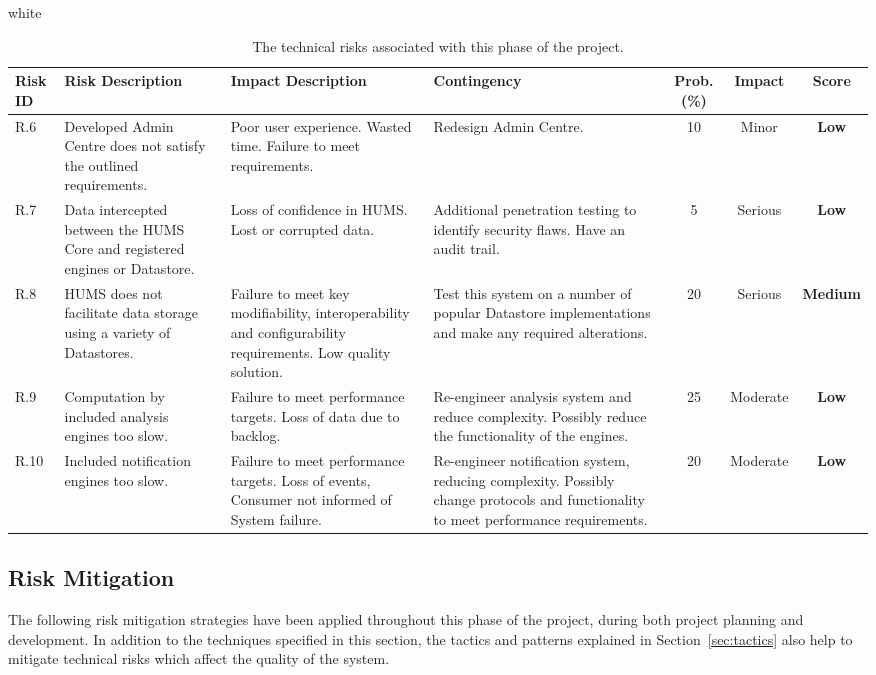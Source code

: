 \documentclass[10pt,a4paper]{article}
\newcommand{\tableformat}[4]{
\begin{table}[ht!]
\centering
  \rowcolors{2}{gray!10} {white}
\def\arraystretch{1.5}
\begin{tabularx}{\textwidth}{#1}
  \hline
  \rowcolor[gray]{0.9} #2
  \hline
\end{tabularx}
\caption{#3}
\label{#4}
\end{table}}
\begin{document}
\tableformat{ p{0.8cm} X X X c c c }
{ 	\hline
    Risk ID & Risk \newline Description & Impact \newline Description & Contingency & Prob. (\%) & Impact & Score \\
  	\hline
  
    R.6 & Developed Admin Centre does not satisfy the outlined requirements. & Poor user experience. Wasted time. Failure to meet requirements. & Redesign Admin Centre. & 10 & Minor & \textbf{Low} \\
    R.7 & Data intercepted between the HUMS Core and registered engines or Datastore. & Loss of confidence in HUMS. Lost or corrupted data. & Additional penetration testing to identify security flaws. Have an audit trail. & 5 & Serious &  \textbf{Low} \\
    R.8 & HUMS does not facilitate data storage using a variety of Datastores. & Failure to meet key modifiability, interoperability and configurability requirements. Low quality solution. & Test this system on a number of popular Datastore implementations and make any required alterations. & 20 & Serious & \textbf{Medium} \\
    R.9 & Computation by included analysis engines too slow. & Failure to meet performance targets. Loss of data due to backlog. & Re-engineer analysis system and reduce complexity. Possibly reduce the functionality of the engines. & 25 & Moderate & \textbf{Low} \\	
    R.10 & Included notification engines too slow. & Failure to meet performance targets. Loss of events, Consumer not informed of System failure. & Re-engineer notification system, reducing complexity. Possibly change protocols and functionality to meet performance requirements. & 20 & Moderate & \textbf{Low} \\	
}
{The technical risks associated with this phase of the project.}{tab:tech_risks}

\subsection{Risk Mitigation}
The following risk mitigation strategies have been applied throughout this phase of the project, during both project planning and development. In addition to the techniques specified in this section, the tactics and patterns explained in Section~\ref{sec:tactics} also help to mitigate technical risks which affect the quality of the system.
\end{document}
